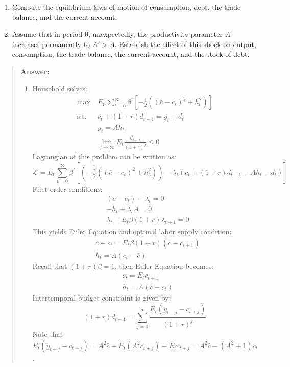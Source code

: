 \begin{exercise}
\begin{enumerate}
\item Compute the equilibrium laws of motion of consumption, debt, the trade balance, and the current account. 
\item Assume that
in period 0, unexpectedly,  
 the productivity parameter $A$ increases permanently to $A'>A$. Establish the effect of this shock on output, consumption, the trade balance, the current account, and the stock of debt. 
\end{enumerate}
 \begin{quote}
{\bf Answer: }
\begin{enumerate}
\item
Household solves:
\begin{align*}
\max\ &{E}_0\sum_{t=0}^{\infty}\beta^t \left[-\frac{1}{2}((\bar{c}-c_t)^2 + h_t^2)\right] \\
\text{s.t.}\ & c_t  + (1+r)d_{t-1} = y_t + d_t \\
& y_t = Ah_t \\ 
& \lim_{j\to\infty}E_t\frac{d_{t+j}}{(1+r)^j} \le 0
\end{align*}
Lagrangian of this problem can be written as:
\begin{equation*}
\mathcal{L} = {E}_0\sum_{t=0}^{\infty}\beta^t \left[ \left(-\frac{1}{2}((\bar{c}-c_t)^2 + h_t^2)\right) - \lambda_t (c_t  + (1+r)d_{t-1} - Ah_t - d_t) \right]
\end{equation*}
First order conditions:
\begin{align*}
&(\bar{c} - c_t) -\lambda_t = 0 \\
& - h_t + \lambda_t A = 0 \\
& \lambda_t - E_t \beta(1+r)\lambda_{t+1} = 0
\end{align*}
This yields Euler Equation and optimal labor supply condition:
\begin{align*}
& \bar{c} - c_t = E_t \beta(1+r)( \bar{c} - c_{t+1}) \\
& h_t = A(c_t-\bar{c})
\end{align*}
Recall that $(1+r)\beta = 1$, then Euler Equation becomes:
\begin{align*}
& c_t = E_t c_{t+1} \\
& h_t = A(\bar{c} - c_t)
\end{align*}
Intertemporal budget constraint is given by:
\begin{equation*}
(1+r)d_{t-1} = \sum_{j=0}^{\infty} \frac{E_t(y_{t+j}-c_{t+j})}{(1+r)^j}
\end{equation*}
Note that $E_t(y_{t+j} - c_{t+j}) =  A^2\bar{c} - E_t(A^2 c_{t+j}) - E_{t}c_{t+j} = A^2 \bar{c} - (A^2 +1)c_t $. 

\end{enumerate}
\end{quote}
\end{exercise}
